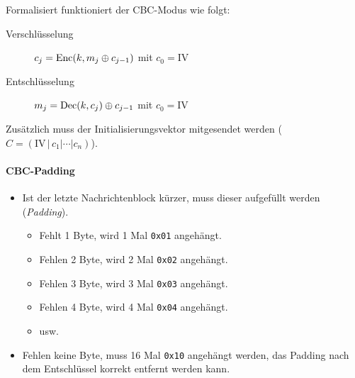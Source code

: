 				Formalisiert funktioniert der CBC-Modus wie folgt:
				\begin{description}
					\item[Verschlüsselung] \( c_j = \operatorname{Enc}(k, m_j \oplus c_{j - 1}) \) mit \( c_0 = \text{IV} \)
					\item[Entschlüsselung] \( m_j = \operatorname{Dec}(k, c_j) \oplus c_{j - 1} \) mit \(c_0 = \text{IV}\)
				\end{description}
				Zusätzlich muss der Initialisierungsvektor mitgesendet werden (\( C = (\text{IV} \,\vert\, c_1 \vert \cdots \vert c_n) \)).

			\paragraph{CBC-Padding}
				\begin{itemize}
					\item Ist der letzte Nachrichtenblock kürzer, muss dieser aufgefüllt werden (\textit{Padding}).
						\begin{itemize}
							\item Fehlt 1 Byte, wird 1 Mal \texttt{0x01} angehängt.
							\item Fehlen 2 Byte, wird 2 Mal \texttt{0x02} angehängt.
							\item Fehlen 3 Byte, wird 3 Mal \texttt{0x03} angehängt.
							\item Fehlen 4 Byte, wird 4 Mal \texttt{0x04} angehängt.
							\item usw.
						\end{itemize}
					\item Fehlen keine Byte, muss 16 Mal \texttt{0x10} angehängt werden, das Padding nach dem Entschlüssel korrekt entfernt werden kann.
				\end{itemize}

